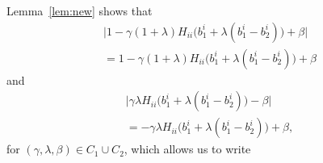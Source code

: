 \documentclass[9pt,shortpaper,twoside,web]{ieeecolor}
\begin{document}
    Lemma~\ref{lem:new} shows that
    \begin{multline}\label{eq:sssproof3}
        \big\vert 1- \gamma(1+\lambda)H_{ii}\big(b^i_1+\lambda(b^i_1-b^i_2)\big) + \beta \big\vert \\= 
        1- \gamma(1+\lambda)H_{ii}\big(b^i_1+\lambda(b^i_1-b^i_2)\big) + \beta
    \end{multline}
    and
    \begin{multline}\label{eq:sssproof4}
        \big\vert \gamma\lambda H_{ii}\big(b^i_1+\lambda(b^i_1-b^i_2)\big)-\beta \big\vert \\= -\gamma\lambda H_{ii}\big(b^i_1+\lambda(b^i_1-b^i_2)\big)+\beta,
    \end{multline}
    for $(\gamma,\lambda,\beta)\in C_1\cup C_2$,
    which allows us to write
    
\end{document}
